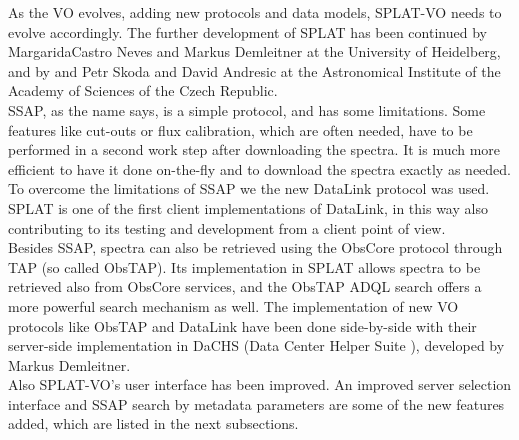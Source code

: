 \documentclass[final,authoryear,5p,times,twocolumn]{elsarticle}
\begin{document}
As the VO evolves, adding new protocols and data models, SPLAT-VO needs to evolve accordingly.
The further development of SPLAT has been continued by MargaridaCastro Neves and Markus Demleitner at the University of Heidelberg, and by and Petr Skoda and David Andresic at the Astronomical Institute of the Academy of Sciences of the Czech Republic.
\\
SSAP, as the name says, is a simple protocol, and has some limitations. Some features like cut-outs or flux calibration, which are often needed, have to be performed in a second work step after downloading the spectra. It is much more efficient to have it done on-the-fly and  to download the spectra exactly as needed. To overcome the limitations of SSAP we the new DataLink\cite{datalink} protocol was used. SPLAT is one of the first client implementations of DataLink, in this way also contributing to its testing and development  from a client point of view.\\
Besides SSAP, spectra can also be retrieved using the ObsCore protocol  through TAP (so called ObsTAP\cite{obstap}). Its implementation in SPLAT allows spectra to be retrieved also from ObsCore services, and the ObsTAP ADQL\cite{adql} search offers a more powerful search mechanism as well. The implementation of new VO protocols like ObsTAP and DataLink have been done side-by-side with their server-side implementation in DaCHS (Data Center Helper Suite \cite{dachs}), developed by Markus Demleitner.\\
Also SPLAT-VO's  user interface has been improved. An improved server selection interface and SSAP search by metadata parameters  are some of the new features added, which are listed in the next subsections.
\end{document}
